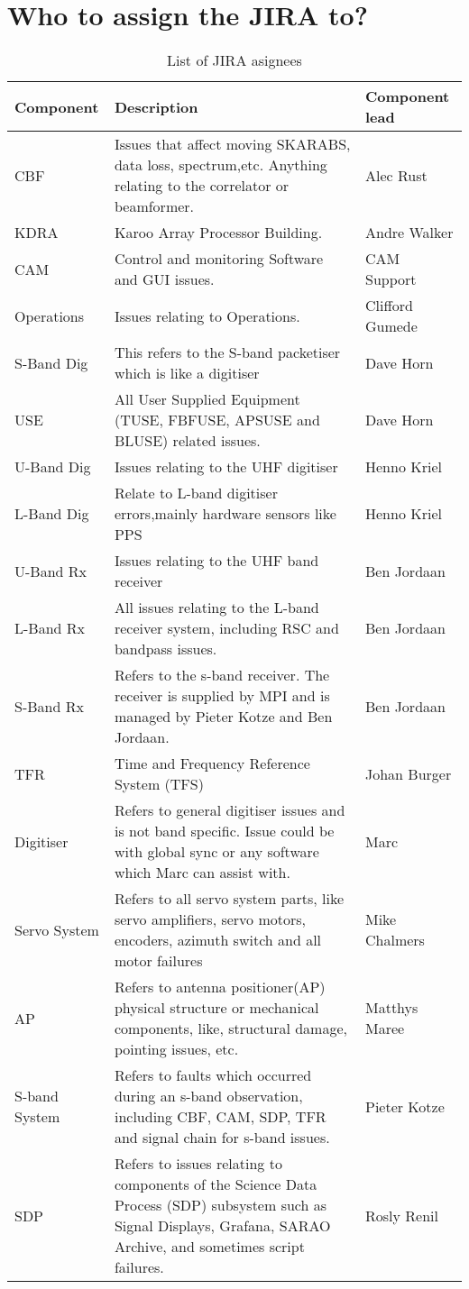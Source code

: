 \section{ Who to assign the JIRA to?}
\begin{table}[H]
	\caption{List of JIRA asignees}
	\label{tab:table1}
  \centering
	\begin{tabular}[b]{|p{4cm}|p{8cm}|p{4cm}|}
		\hline
		\textbf{Componen}t&\textbf{Description}&\textbf{Component lead}\\
		\hline
		CBF&
		Issues that affect moving SKARABS, data loss, spectrum,etc. Anything relating to the correlator or beamformer.&Alec Rust\\
		\hline
		KDRA&
		Karoo Array Processor Building.&
		Andre Walker\\
		\hline
		CAM&
		Control and monitoring Software and GUI issues.&
		CAM Support\\
		\hline
		Operations&
		Issues relating to Operations.&
		Clifford Gumede\\
		\hline
		S-Band Dig&
		This refers to the S-band packetiser which is like a digitiser&
		Dave Horn\\
		\hline
		USE&
		All User Supplied Equipment (TUSE, FBFUSE, APSUSE and BLUSE) related issues.&
		Dave Horn\\
		\hline
		U-Band Dig&
		Issues relating to the UHF digitiser&
		Henno Kriel\\
		\hline
		L-Band Dig&
		Relate to L-band digitiser errors,mainly hardware sensors like PPS&
		Henno Kriel\\
		\hline
		U-Band Rx&
		Issues relating to the UHF band receiver&
		Ben Jordaan\\
		\hline
		L-Band Rx&
		All issues relating to the L-band receiver system, including RSC and bandpass issues.&
		Ben Jordaan\\
		\hline
		S-Band Rx&
		Refers to the s-band receiver. The receiver is supplied by MPI and is managed by Pieter Kotze and Ben Jordaan.&
		Ben Jordaan\\
		\hline
		TFR&
		Time and Frequency Reference System (TFS)&
		Johan Burger\\
		\hline
		Digitiser&
		Refers to general digitiser issues and is not band specific. Issue could be with global sync or any software which Marc can assist with. &
		Marc\\
		\hline
		Servo System&
		Refers to all servo system parts, like servo amplifiers, servo motors, encoders, azimuth switch and all motor failures&
		Mike Chalmers\\
		\hline
		AP&
		Refers to antenna positioner(AP) physical structure or mechanical components, like, structural damage, pointing issues, etc.&
		Matthys Maree\\
		\hline
		S-band System&
		Refers to faults which occurred during an s-band observation, including CBF, CAM, SDP, TFR and signal chain for s-band issues.&
		Pieter Kotze\\
		\hline
		SDP&
		Refers to issues relating to  components of the Science Data Process (SDP) subsystem such as Signal Displays, Grafana, SARAO Archive, and sometimes script failures.&
		Rosly Renil\\
	

\end{tabular}
\end{table}
